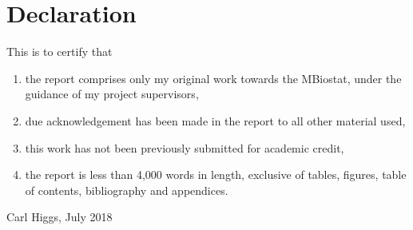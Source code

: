 \section*{Declaration}

This is to certify that
\begin{enumerate}
	\item the report comprises only my original work towards the MBiostat, under the guidance of my project supervisors,
	\item due acknowledgement has been made in the report to all other material used,
  \item this work has not been previously submitted for academic credit,
	\item the report is less than 4,000 words in length, exclusive of tables, figures, table of contents, bibliography and appendices.
\end{enumerate}
\vspace{5cm}
\underline{\hspace{7.52cm}} \par
Carl Higgs, July 2018 \par
\vfill\null